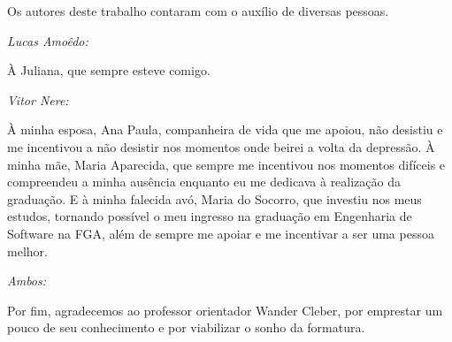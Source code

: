 \begin{agradecimentos}

Os autores deste trabalho contaram com o auxílio de diversas pessoas.

\textit{Lucas Amoêdo:}

À Juliana, que sempre esteve comigo.

\textit{Vitor Nere:}

À minha esposa, Ana Paula, companheira de vida que me apoiou, não desistiu e me incentivou a não desistir nos momentos onde beirei a volta da depressão. À minha mãe, Maria Aparecida, que sempre me incentivou nos momentos difíceis e compreendeu a minha ausência enquanto eu me dedicava à realização da graduação. E à minha falecida avó, Maria do Socorro, que investiu nos meus estudos, tornando possível o meu ingresso na graduação em Engenharia de Software na FGA, além de sempre me apoiar e me incentivar a ser uma pessoa melhor.

\textit{Ambos:}

Por fim, agradecemos ao professor orientador Wander Cleber, por emprestar um
pouco de seu conhecimento e por viabilizar o sonho da formatura.

\end{agradecimentos}
